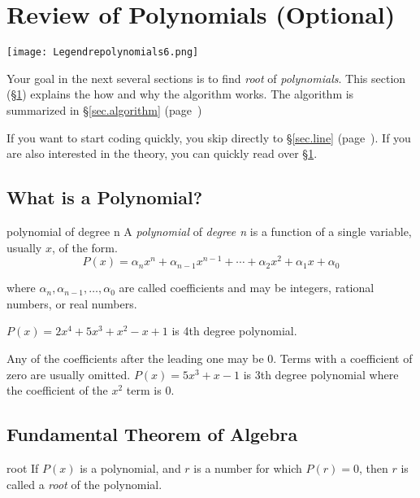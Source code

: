 \section{Review of Polynomials (Optional)}
\label{sec.general}

\texttt{[image: Legendrepolynomials6.png]}

Your goal in the next several sections is to find \emph{root} of
\emph{polynomials}.  This section (\S\ref{sec.general}) explains
the how and why the algorithm works.  The algorithm is summarized
in \S\ref{sec.algorithm} (page~\pageref{sec.algorithm})

If you want to start coding quickly, you skip directly to
\S\ref{sec.line} (page~\pageref{sec.line}).  If you are also
interested in the theory, you can quickly read over
\S\ref{sec.general}.


\subsection{What is a Polynomial?}

\begin{definition}{polynomial of degree n}{}
  A \emph{polynomial} of \emph{degree n} is a function of a single
  variable, usually $x$, of the form.
  \[P(x) = \alpha_n x^n + \alpha_{n-1} x^{n-1} + \cdots + \alpha_2 x^2 + \alpha_1 x + \alpha_0 \]

  where $\alpha_n, \alpha_{n-1}, \ldots, \alpha_0$ are called
  coefficients and may be integers, rational numbers, or real numbers.
\end{definition}

$P(x) = 2 x^4 + 5 x^3 + x^2 - x + 1$ is 4th degree polynomial.


Any of the coefficients after the leading one may be 0.  Terms with a coefficient of zero
are usually omitted.  $P(x) = 5 x^3 + x - 1$ is 3th degree polynomial
where the coefficient of the $x^2$ term is 0.


\subsection{Fundamental Theorem of Algebra}

\begin{definition}{root}{}
  If $P(x)$ is a polynomial, and $r$ is a number for which $P(r)=0$,
  then $r$ is called a \emph{root} of the polynomial.
\end{definition}

